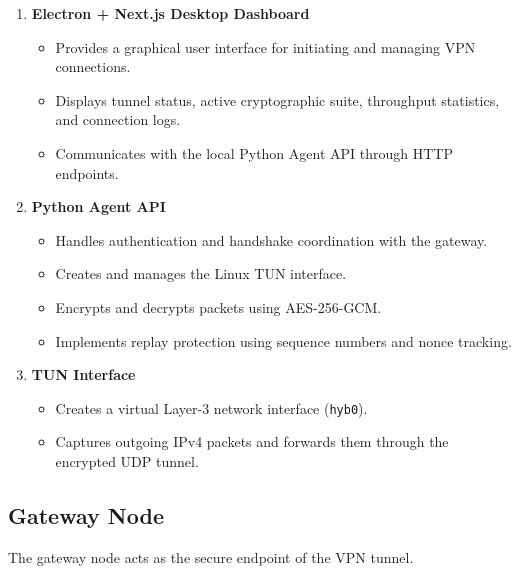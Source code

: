 \begin{enumerate}
    \item \textbf{Electron + Next.js Desktop Dashboard}
    \begin{itemize}
        \item Provides a graphical user interface for initiating and managing VPN connections.
        \item Displays tunnel status, active cryptographic suite, throughput statistics, and connection logs.
        \item Communicates with the local Python Agent API through HTTP endpoints.
    \end{itemize}

    \item \textbf{Python Agent API}
    \begin{itemize}
        \item Handles authentication and handshake coordination with the gateway.
        \item Creates and manages the Linux TUN interface.
        \item Encrypts and decrypts packets using AES-256-GCM.
        \item Implements replay protection using sequence numbers and nonce tracking.
    \end{itemize}

    \item \textbf{TUN Interface}
    \begin{itemize}
        \item Creates a virtual Layer-3 network interface (\texttt{hyb0}).
        \item Captures outgoing IPv4 packets and forwards them through the encrypted UDP tunnel.
    \end{itemize}
\end{enumerate}

\subsection{Gateway Node}

The gateway node acts as the secure endpoint of the VPN tunnel.

